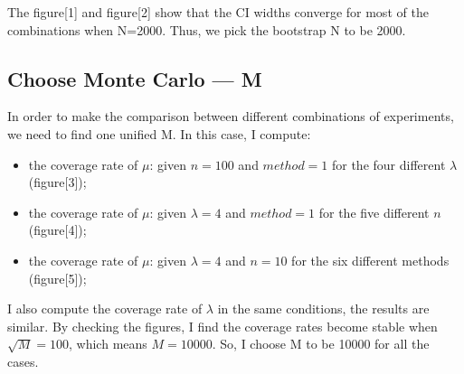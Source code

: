 \documentclass[12pt]{article}
\begin{document}
The figure[1] and figure[2] show that the CI widths converge for most of the combinations when N=2000. Thus, we pick the bootstrap N to be 2000.\\




\subsection{Choose Monte Carlo --- M}
In order to make the comparison between different combinations of experiments, we need to find one unified M. In this case, I compute:
\begin{itemize}
 \item the coverage rate of $\mu$:  given $n=100$ and $method=1$ for the four different $\lambda$ (figure[3]);
 \item the coverage rate of $\mu$:  given $\lambda=4$ and $method=1$ for the five different $n$ (figure[4]);
 \item the coverage rate of $\mu$:  given $\lambda=4$ and $n=10$  for the six different methods (figure[5]);
 \end{itemize}

I also compute the coverage rate of $\lambda$ in the same conditions, the results are similar. By checking the figures, I find the coverage rates become stable when $\sqrt{M}=100$, which means $M=10000$. So, I choose M to be 10000 for all the cases.\\
\end{document}
